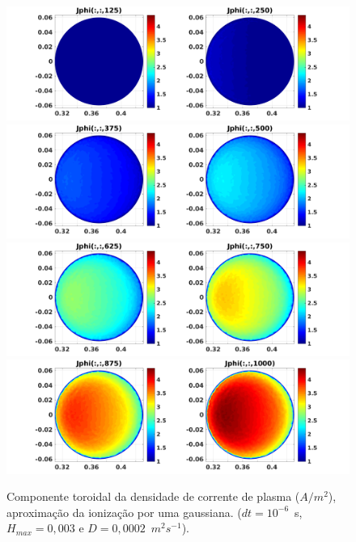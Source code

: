\documentclass[12pt,oneside,a4paper]{abntex2}
\begin{document}
\begin{figure}[H]
\centering
\includegraphics[scale=0.5]{../SImulacao_breakdown/PDE/Jphitod1B6.png}  
\includegraphics[scale=0.5]{../SImulacao_breakdown/PDE/Jphitod2B6.png} 
\includegraphics[scale=0.5]{../SImulacao_breakdown/PDE/Jphitod3B6.png} 
\includegraphics[scale=0.5]{../SImulacao_breakdown/PDE/Jphitod4B6.png} 
\caption{Componente toroidal da densidade de corrente de plasma ($A/m^2$), aproximação da ionização por uma gaussiana. ($dt=10^{-6}$\ s, $H_{max} = 0,003$ e $D=0,0002$\ $m^2s^{-1}$).}
\label{densidadeCB}
\end{figure}
\end{document}

